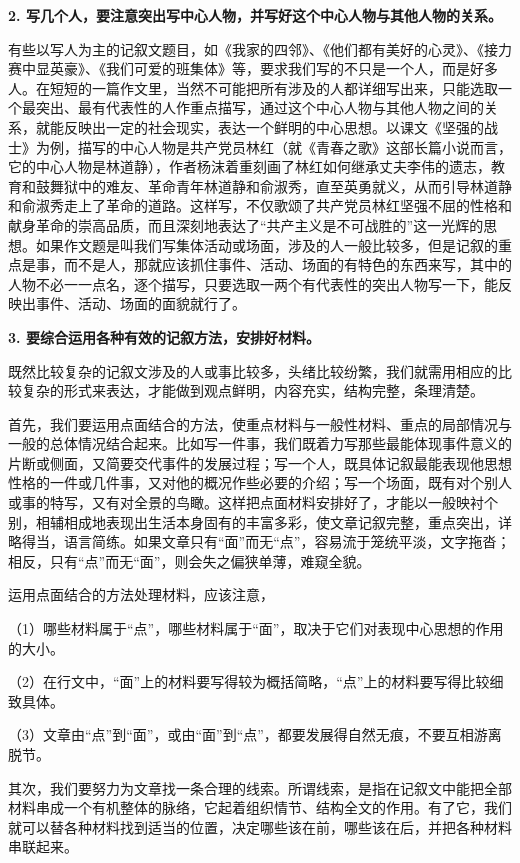 \textbf{2. 写几个人，要注意突出写中心人物，并写好这个中心人物与其他人物的关系。}

有些以写人为主的记叙文题目，如《我家的四邻》、《他们都有美好的心灵》、《接力赛中显英豪》、《我们可爱的班集体》等，要求我们写的不只是一个人，而是好多人。在短短的一篇作文里，当然不可能把所有涉及的人都详细写出来，只能选取一个最突出、最有代表性的人作重点描写，通过这个中心人物与其他人物之间的关系，就能反映出一定的社会现实，表达一个鲜明的中心思想。以课文《坚强的战士》为例，描写的中心人物是共产党员林红（就《青春之歌》这部长篇小说而言，它的中心人物是林道静），作者杨沫着重刻画了林红如何继承丈夫李伟的遗志，教育和鼓舞狱中的难友、革命青年林道静和俞淑秀，直至英勇就义，从而引导林道静和俞淑秀走上了革命的道路。这样写，不仅歌颂了共产党员林红坚强不屈的性格和献身革命的崇高品质，而且深刻地表达了“共产主义是不可战胜的”这一光辉的思想。如果作文题是叫我们写集体活动或场面，涉及的人一般比较多，但是记叙的重点是事，而不是人，那就应该抓住事件、活动、场面的有特色的东西来写，其中的人物不必一一点名，逐个描写，只要选取一两个有代表性的突出人物写一下，能反映出事件、活动、场面的面貌就行了。

\textbf{3. 要综合运用各种有效的记叙方法，安排好材料。}

既然比较复杂的记叙文涉及的人或事比较多，头绪比较纷繁，我们就需用相应的比较复杂的形式来表达，才能做到观点鲜明，内容充实，结构完整，条理清楚。

首先，我们要运用点面结合的方法，使重点材料与一般性材料、重点的局部情况与一般的总体情况结合起来。比如写一件事，我们既着力写那些最能体现事件意义的片断或侧面，又简要交代事件的发展过程；写一个人，既具体记叙最能表现他思想性格的一件或几件事，又对他的概况作些必要的介绍；写一个场面，既有对个别人或事的特写，又有对全景的鸟瞰。这样把点面材料安排好了，才能以一般映衬个别，相辅相成地表现出生活本身固有的丰富多彩，使文章记叙完整，重点突出，详略得当，语言简练。如果文章只有“面”而无“点”，容易流于笼统平淡，文字拖沓；相反，只有“点”而无“面”，则会失之偏狭单薄，难窥全貌。

运用点面结合的方法处理材料，应该注意，

（1）哪些材料属于“点”，哪些材料属于“面”，取决于它们对表现中心思想的作用的大小。

（2）在行文中，“面”上的材料要写得较为概括简略，“点”上的材料要写得比较细致具体。

（3）文章由“点”到“面”，或由“面”到“点”，都要发展得自然无痕，不要互相游离脱节。

其次，我们要努力为文章找一条合理的线索。所谓线索，是指在记叙文中能把全部材料串成一个有机整体的脉络，它起着组织情节、结构全文的作用。有了它，我们就可以替各种材料找到适当的位置，决定哪些该在前，哪些该在后，并把各种材料串联起来。

